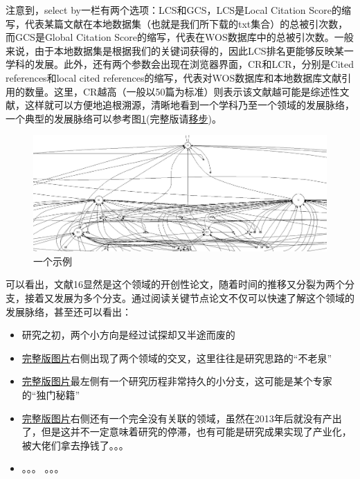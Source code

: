 \documentclass[UTF8,oneside]{ctexbook}
\begin{document}
注意到，select by一栏有两个选项：LCS和GCS，LCS是Local Citation Score的缩写，代表某篇文献在本地数据集（也就是我们所下载的txt集合）的总被引次数，而GCS是Global Citation Score的缩写，代表在WOS数据库中的总被引次数。一般来说，由于本地数据集是根据我们的关键词获得的，因此LCS排名更能够反映某一学科的发展。此外，还有两个参数会出现在浏览器界面，CR和LCR，分别是Cited references和local cited references的缩写，代表对WOS数据库和本地数据库文献引用的数量。这里，CR越高（一般以50篇为标准）则表示该文献越可能是综述性文献，这样就可以方便地追根溯源，清晰地看到一个学科乃至一个领域的发展脉络，一个典型的发展脉络可以参考图\ref{fig:typical_trace}(完整版请\href{https://raw.githubusercontent.com/lonelybag/Latex_lonelybag/V1.0/Script/002_NOTE_of_MASTER/Figure/typical_trace_full.jpg}{移步})。

\begin{figure}[!htb]
	\centering
	\includegraphics[width=1\linewidth]{Figure/typical_trace.JPG}
	\vspace{-0.3cm}
	\caption{一个示例}\label{fig:typical_trace}
\end{figure}

可以看出，文献16显然是这个领域的开创性论文，随着时间的推移又分裂为两个分支，接着又发展为多个分支。通过阅读关键节点论文不仅可以快速了解这个领域的发展脉络，甚至还可以看出：

\begin{itemize}
	\item 研究之初，两个小方向是经过试探却又半途而废的
	\item \href{https://raw.githubusercontent.com/lonelybag/Latex_lonelybag/V1.0/Script/002_NOTE_of_MASTER/Figure/typical_trace_full.jpg}{完整版图片}右侧出现了两个领域的交叉，这里往往是研究思路的“不老泉”
	\item \href{https://raw.githubusercontent.com/lonelybag/Latex_lonelybag/V1.0/Script/002_NOTE_of_MASTER/Figure/typical_trace_full.jpg}{完整版图片}最左侧有一个研究历程非常持久的小分支，这可能是某个专家的“独门秘籍”
	\item \href{https://raw.githubusercontent.com/lonelybag/Latex_lonelybag/V1.0/Script/002_NOTE_of_MASTER/Figure/typical_trace_full.jpg}{完整版图片}右侧还有一个完全没有关联的领域，虽然在2013年后就没有产出了，但是这并不一定意味着研究的停滞，也有可能是研究成果实现了产业化，被大佬们拿去挣钱了。。。
	\item 。。。 。。。
\end{itemize}
\end{document}
